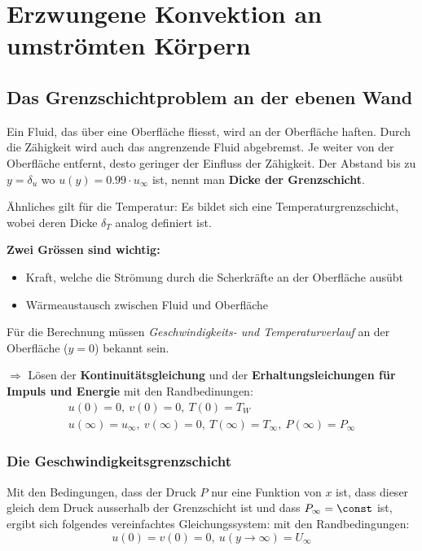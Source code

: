 
\section{Erzwungene Konvektion an um\-ström\-ten Kör\-pern} %
	\subsection{Das Grenzschichtproblem an der ebenen Wand} %
		Ein Fluid, das über eine Oberfläche fliesst, wird an der Oberfläche haften. Durch die Zähigkeit wird auch das angrenzende Fluid abgebremst. Je weiter von der Oberfläche entfernt, desto geringer der Einfluss der Zähigkeit. Der Abstand bis zu $y = \delta_u$ wo $u(y) = 0.99 \cdot u_\infty$ ist, nennt man \textbf{Dicke der Grenzschicht}.
		
		Ähnliches gilt für die Temperatur: Es bildet sich eine Temperaturgrenzschicht, wobei deren Dicke $\delta_T$ analog definiert ist.
		
		\textbf{Zwei Grössen sind wichtig:}
		\begin{itemize}
			\item Kraft, welche die Strömung durch die Scherkräfte an der Oberfläche ausübt
			\item Wärmeaustausch zwischen Fluid und Oberfläche
		\end{itemize}
		Für die Berechnung müssen \emph{Geschwindigkeits- und Temperaturverlauf} an der Oberfläche ($y=0$) bekannt sein.
		
		$\Rightarrow$ Lösen der \textbf{Kontinuitätsgleichung} und der \textbf{Erhaltungsleichungen für Impuls und Energie} mit den Randbedinungen:
		\begin{gather*}
			u(0) = 0,\ v(0) = 0,\ T(0) = T_W \\
			u(\infty) = u_\infty,\ v(\infty) = 0,\ T(\infty) = T_\infty,\ P(\infty) = P_\infty
		\end{gather*}
		
		\subsubsection{Die Geschwindigkeitsgrenzschicht} %
			Mit den Bedingungen, dass der Druck $P$ nur eine Funktion von $x$ ist, dass dieser gleich dem Druck ausserhalb der Grenzschicht ist und dass $P_\infty = \const$ ist, ergibt sich folgendes vereinfachtes Gleichungssystem:
			mit den Randbedingungen:
			\[
				u(0) = v(0) = 0,\ u(y \to \infty) = U_\infty
			\]
